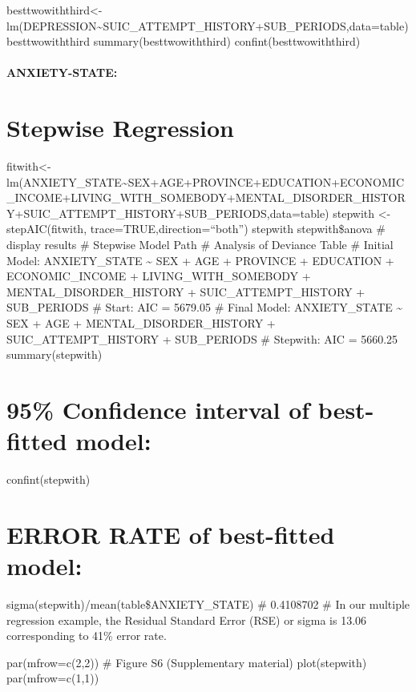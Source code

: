 \documentclass[
]{book}
\begin{document}
besttwowiththird\textless-lm(DEPRESSION\textasciitilde SUIC\_ATTEMPT\_HISTORY+SUB\_PERIODS,data=table)
besttwowiththird
summary(besttwowiththird)
confint(besttwowiththird)

\hypertarget{anxiety-state-1}{%
\subsubsection{ANXIETY-STATE:}\label{anxiety-state-1}}

\hypertarget{stepwise-regression-1}{%
\chapter{Stepwise Regression}\label{stepwise-regression-1}}

fitwith\textless-lm(ANXIETY\_STATE\textasciitilde SEX+AGE+PROVINCE+EDUCATION+ECONOMIC\_INCOME+LIVING\_WITH\_SOMEBODY+MENTAL\_DISORDER\_HISTORY+SUIC\_ATTEMPT\_HISTORY+SUB\_PERIODS,data=table)
stepwith \textless- stepAIC(fitwith, trace=TRUE,direction=``both'')
stepwith
stepwith\$anova \# display results
\# Stepwise Model Path
\# Analysis of Deviance Table
\# Initial Model: ANXIETY\_STATE \textasciitilde{} SEX + AGE + PROVINCE + EDUCATION + ECONOMIC\_INCOME + LIVING\_WITH\_SOMEBODY + MENTAL\_DISORDER\_HISTORY + SUIC\_ATTEMPT\_HISTORY + SUB\_PERIODS
\# Start: AIC = 5679.05
\# Final Model: ANXIETY\_STATE \textasciitilde{} SEX + AGE + MENTAL\_DISORDER\_HISTORY + SUIC\_ATTEMPT\_HISTORY + SUB\_PERIODS
\# Stepwith: AIC = 5660.25
summary(stepwith)

\hypertarget{confidence-interval-of-best-fitted-model-1}{%
\chapter{95\% Confidence interval of best-fitted model:}\label{confidence-interval-of-best-fitted-model-1}}

confint(stepwith)

\hypertarget{error-rate-of-best-fitted-model-1}{%
\chapter{ERROR RATE of best-fitted model:}\label{error-rate-of-best-fitted-model-1}}

sigma(stepwith)/mean(table\$ANXIETY\_STATE)
\# 0.4108702
\# In our multiple regression example, the Residual Standard Error (RSE) or sigma is 13.06 corresponding to 41\% error rate.

par(mfrow=c(2,2))
\# Figure S6 (Supplementary material)
plot(stepwith)
par(mfrow=c(1,1))
\end{document}

